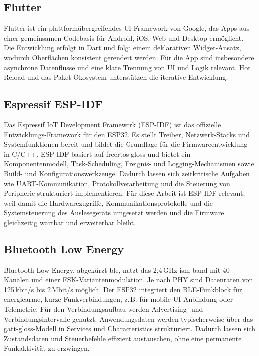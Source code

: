 \subsection{Flutter}
Flutter ist ein plattformübergreifendes UI-Framework von Google, das Apps aus einer gemeinsamen Codebasis für Android, iOS, Web und Desktop ermöglicht. Die Entwicklung erfolgt in Dart und folgt einem deklarativen Widget-Ansatz, wodurch Oberflächen konsistent gerendert werden. Für die App sind insbesondere asynchrone Datenflüsse und eine klare Trennung von UI und Logik relevant. Hot Reload und das Paket-Ökosystem unterstützen die iterative Entwicklung.\cite{flutter-docs}
\subsection{Espressif ESP-IDF}
Das Espressif IoT Development Framework (ESP-IDF) ist das offizielle Entwicklungs-Framework für den ESP32. Es stellt Treiber, Netzwerk-Stacks und Systemfunktionen bereit und bildet die Grundlage für die Firmwareentwicklung in C/C++. ESP-IDF basiert auf \gls{freertos-gloss} und bietet ein Komponentenmodell, Task-Scheduling, Ereignis- und Logging-Mechanismen sowie Build- und Konfigurationswerkzeuge. Dadurch lassen sich zeitkritische Aufgaben wie UART-Kommunikation, Protokollverarbeitung und die Steuerung von Peripherie strukturiert implementieren. Für diese Arbeit ist ESP-IDF relevant, weil damit die Hardwarezugriffe, Kommunikationsprotokolle und die Systemsteuerung des Auslesegeräts umgesetzt werden und die Firmware gleichzeitig wartbar und erweiterbar bleibt.\cite{espressif-esp-idf}

\subsection{Bluetooth Low Energy}
Bluetooth Low Energy, abgekürzt \gls{ble}, nutzt das 2{,}4\,GHz-\gls{ism-band} mit 40 Kanälen und einer FSK-Variantenmodulation. Je nach PHY sind Datenraten von 125\,kbit/s bis 2\,Mbit/s möglich. Der ESP32 integriert den BLE-Funkblock für energiearme, kurze Funkverbindungen, z.\,B. für mobile UI-Anbindung oder Telemetrie. Für den Verbindungsaufbau werden Advertising- und Verbindungsintervalle genutzt. Anwendungsdaten werden typischerweise über das \gls{gatt-gloss}-Modell in Services und Characteristics strukturiert. Dadurch lassen sich Zustandsdaten und Steuerbefehle effizient austauschen, ohne eine permanente Funkaktivität zu erzwingen.\cite{bluetooth-core54,espressif-esp32}
